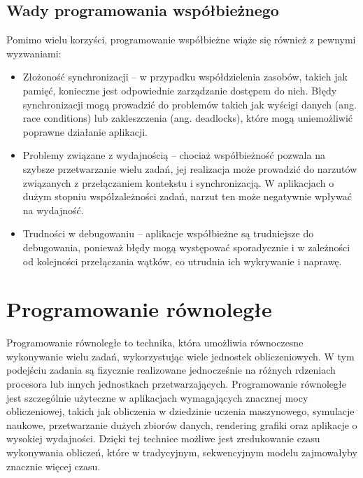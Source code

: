 \subsection{Wady programowania współbieżnego}
Pomimo wielu korzyści, programowanie współbieżne wiąże się również z pewnymi wyzwaniami:
\begin{itemize}
    \item Złożoność synchronizacji – w przypadku współdzielenia zasobów, takich jak pamięć, konieczne jest odpowiednie zarządzanie dostępem do nich. Błędy synchronizacji mogą prowadzić do problemów takich jak wyścigi danych (ang. race conditions) lub zakleszczenia (ang. deadlocks), które mogą uniemożliwić poprawne działanie aplikacji.
    \item Problemy związane z wydajnością – chociaż współbieżność pozwala na szybsze przetwarzanie wielu zadań, jej realizacja może prowadzić do narzutów związanych z przełączaniem kontekstu i synchronizacją. W aplikacjach o dużym stopniu współzależności zadań, narzut ten może negatywnie wpływać na wydajność.
    \item Trudności w debugowaniu – aplikacje współbieżne są trudniejsze do debugowania, ponieważ błędy mogą występować sporadycznie i w zależności od kolejności przełączania wątków, co utrudnia ich wykrywanie i naprawę.
\end{itemize}

\section{Programowanie równoległe}

Programowanie równoległe to technika, która umożliwia równoczesne wykonywanie wielu zadań, wykorzystując wiele jednostek obliczeniowych. W tym podejściu zadania są fizycznie realizowane jednocześnie na różnych rdzeniach procesora lub innych jednostkach przetwarzających. Programowanie równoległe jest szczególnie użyteczne w aplikacjach wymagających znacznej mocy obliczeniowej, takich jak obliczenia w dziedzinie uczenia maszynowego, symulacje naukowe, przetwarzanie dużych zbiorów danych, rendering grafiki oraz aplikacje o wysokiej wydajności. Dzięki tej technice możliwe jest zredukowanie czasu wykonywania obliczeń, które w tradycyjnym, sekwencyjnym modelu zajmowałyby znacznie więcej czasu.

